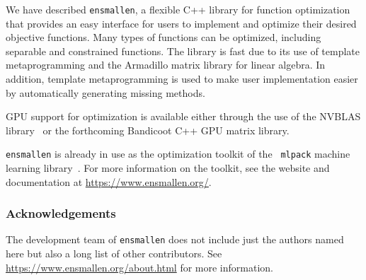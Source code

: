\documentclass{article}
\begin{document}
We have described {\tt ensmallen}, a flexible C++ library for function
optimization that provides an easy interface for users to implement and optimize
their desired objective functions.  Many types of functions can be optimized,
including separable and constrained functions.  The library is fast due to its
use of template metaprogramming and the Armadillo matrix library for linear
algebra.  In addition, template metaprogramming is used to make user
implementation easier by automatically generating missing methods.

GPU support for optimization is available either through the use of the NVBLAS
library~\cite{nvidia2015} or the forthcoming Bandicoot C++ GPU matrix library.

{\tt ensmallen} is already in use as the optimization toolkit of the {\tt
mlpack} machine learning library~\cite{mlpack2018}.  For more information on the
toolkit, see the website and documentation at \url{https://www.ensmallen.org/}.

\subsubsection*{Acknowledgements}

The development team of {\tt ensmallen} does not include just the authors named
here but also a long list of other contributors.  See
\url{https://www.ensmallen.org/about.html} for more information.



\end{document}

